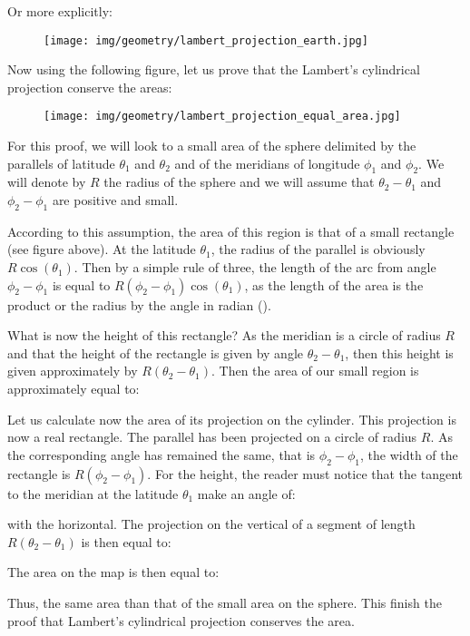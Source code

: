 	Or more explicitly:
	\begin{figure}[H]
		\centering
		\texttt{[image: img/geometry/lambert\_projection\_earth.jpg]}
	\end{figure}
	Now using the following figure, let us prove that the Lambert's cylindrical projection conserve the areas:
	\begin{figure}[H]
		\centering
		\texttt{[image: img/geometry/lambert\_projection\_equal\_area.jpg]}
	\end{figure}
	For this proof, we will look to a small area of the sphere delimited by the parallels of latitude $\theta_1$ and $\theta_2$ and of the meridians of longitude $\phi_1$ and $\phi_2$. We will denote by $R$ the radius of the sphere and we will assume that $\theta_2-\theta_1$ and $\phi_2-\phi_1$ are positive and small.

	According to this assumption, the area of this region is that of a small rectangle (see figure above). At the latitude $\theta_1$, the radius of the parallel is obviously $R\cos(\theta_1)$. Then by a simple rule of three, the length of the arc from angle $\phi_2-\phi_1$ is equal to $R(\phi_2-\phi_1)\cos(\theta_1)$, as the length of the area is the product or the radius by the angle in radian ().
	
	What is now the height of this rectangle? As the meridian is a circle of radius $R$ and that the height of the rectangle is given by angle $\theta_2-\theta_1$, then this height is given approximately by $R(\theta_2-\theta_1)$. Then the area of our small region is approximately equal to:
	
	Let us calculate now the area of its projection on the cylinder. This projection is now a real rectangle. The parallel has been projected on a circle of radius $R$. As the corresponding angle has remained the same, that is $\phi_2-\phi_1$, the width of the rectangle is $R(\phi_2-\phi_1)$. For the height, the reader must notice that the tangent to the meridian at the latitude $\theta_1$ make an angle of:
	
	with the horizontal. The projection on the vertical of a segment of length $R(\theta_2-\theta_1)$ is then equal to:
	
	The area on the map is then equal to:
	
	Thus, the same area than that of the small area on the sphere. This finish the proof that Lambert's cylindrical projection conserves the area.
	
